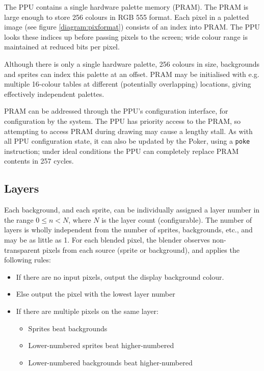 \documentclass[notitlepage]{article}
\begin{document}
The PPU contains a single hardware palette memory (PRAM). The PRAM is large enough to store 256 colours in RGB 555 format. Each pixel in a paletted image (see figure \ref{diagram:pixformat}) consists of an index into PRAM. The PPU looks these indices up before passing pixels to the screen; wide colour range is maintained at reduced bits per pixel.

Although there is only a single hardware palette, 256 colours in size, backgrounds and sprites can index this palette at an offset. PRAM may be initialised with e.g. multiple 16-colour tables at different (potentially overlapping) locations, giving effectively independent palettes.

PRAM can be addressed through the PPU's configuration interface, for configuration by the system. The PPU has priority access to the PRAM, so attempting to access PRAM during drawing may cause a lengthy stall. As with all PPU configuration state, it can also be updated by the Poker, using a \texttt{poke} instruction; under ideal conditions the PPU can completely replace PRAM contents in 257 cycles.

\subsection{Layers}

Each background, and each sprite, can be individually assigned a layer number in the range $0 \leq n < N$, where $N$ is the layer count (configurable). The number of layers is wholly independent from the number of sprites, backgrounds, etc., and may be as little as 1. For each blended pixel, the blender observes non-transparent pixels from each source (sprite or background), and applies the following rules:

\begin{itemize}
	\item If there are no input pixels, output the display background colour.
	\item Else output the pixel with the lowest layer number
	\item If there are multiple pixels on the same layer:
	\begin{itemize}
		\item Sprites beat backgrounds
		\item Lower-numbered sprites beat higher-numbered
		\item Lower-numbered backgrounds beat higher-numbered
	\end{itemize}
\end{itemize}
\end{document}
